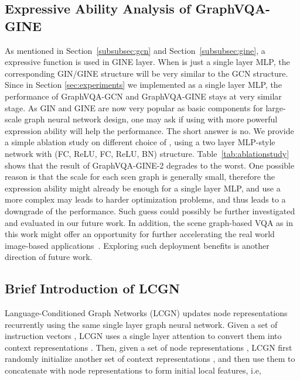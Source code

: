 \documentclass[11pt]{article}
\begin{document}
\subsection{Expressive Ability Analysis of GraphVQA-GINE}
\label{comp_gcn_gine}


As mentioned in Section~\ref{subsubsec:gcn} and Section~\ref{subsubsec:gine}, a expressive function  is used in GINE layer. When  is just a single layer MLP, the corresponding GIN/GINE structure will be very similar to the GCN structure. Since in Section \ref{sec:experiments} we implemented  as a single layer MLP, the performance of GraphVQA-GCN and GraphVQA-GINE stays at very similar stage. As GIN and GINE are now very popular as basic components for large-scale graph neural network design, one may ask if using  with more powerful expression ability will help the performance. The short answer is no. We provide a simple ablation study on different choice of , using a two layer MLP-style network with (FC, ReLU, FC, ReLU, BN) structure. Table~\ref{tab:ablationstudy} shows that the result of GraphVQA-GINE-2 degrades to the worst. One possible reason is that the scale for each scen graph is generally small, therefore the expression ability might already be enough for a single layer MLP, and use a more complex  may leads to harder optimization problems, and thus leads to a downgrade of the performance. Such guess could possibly be further investigated and evaluated in our future work. 
In addition, the scene graph-based VQA as in this work might offer an opportunity for further accelerating the real world image-based applications~\cite{DBLP:journals/corr/abs-2011-10704}. Exploring such deployment benefits is another direction of future work. 








\subsection{Brief Introduction of LCGN}
\label{subsec:LCGN}
Language-Conditioned Graph Networks (LCGN) \cite{LCGN} updates node representations recurrently using the same single layer graph neural network. Given a set of instruction vectors , LCGN uses a single layer attention to convert them into context representations . Then,
given a set of node representations  , LCGN first randomly initialize another set of context representations , and then use them to concatenate with  node representations to form  initial local features, i.e,
\end{document}
